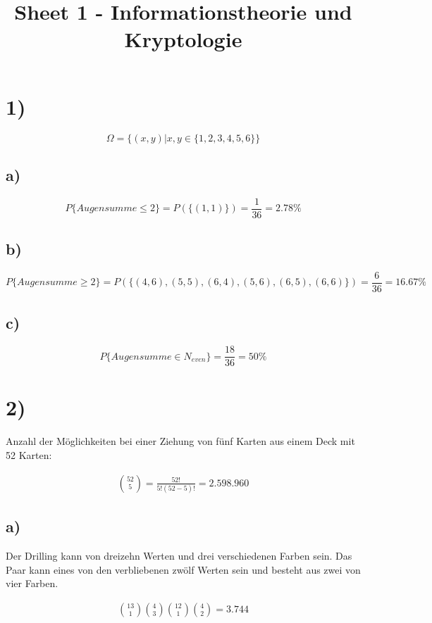 \documentclass{article}
\begin{document}
  \title{Sheet 1 - Informationstheorie und Kryptologie}
  \date{}
  \author{}

  \maketitle

\section*{1)}
  \[ \Omega = \{(x,y) |x,y \in \{ 1,2,3,4,5,6 \} \} \]

  \subsection*{a)}
    \[ P \{ Augensumme \leq 2 \} = P(\{ (1,1)\} ) = \frac{1}{36} = 2.78\% \]

  \subsection*{b)}
    \[ P \{ Augensumme \geq 2 \} = P(\{ (4,6), (5,5), (6,4), (5,6), (6,5), (6,6)\} ) = \frac{6}{36} = 16.67\% \]

  \subsection*{c)}
    \[ P \{ Augensumme \in N_{even} \} = \frac{18}{36} = 50\% \]

\section*{2)}
  Anzahl der Möglichkeiten bei einer Ziehung von fünf Karten aus einem Deck mit 52 Karten:

  \begin{align*}
    \binom{52}{5} = \frac{52!}{5!(52-5)!} = 2.598.960
  \end{align*}

  \subsection*{a)}
  Der Drilling kann von dreizehn Werten und drei verschiedenen Farben sein. Das Paar kann eines von den verbliebenen zwölf Werten sein und besteht aus zwei von vier Farben.

  \begin{align*}
    \binom{13}{1}\binom{4}{3}\binom{12}{1}\binom{4}{2} = 3.744
  \end{align*}
\end{document}

